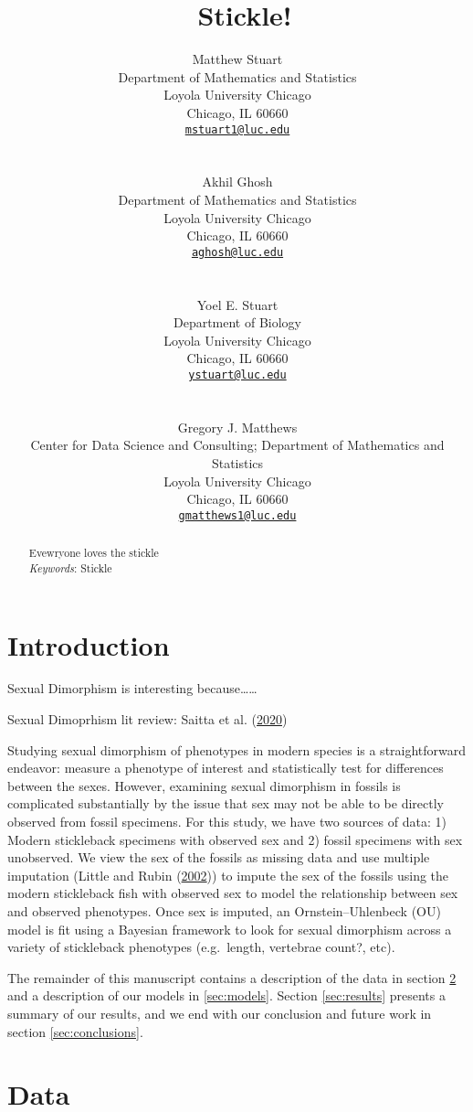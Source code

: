 \documentclass[
  12pt,
]{article}
\title{~\Large Stickle!}
\author{\large Matthew Stuart \vspace{-1.1mm}\\
\normalsize Department of Mathematics and Statistics \vspace{-1.1mm}\\
\normalsize Loyola University Chicago \vspace{-1.1mm}\\
\normalsize Chicago, IL 60660 \vspace{-1.1mm}\\
\normalsize \href{mailto:mstuart1@luc.edu}{\texttt{mstuart1@luc.edu}}
\vspace{-1.1mm}\\
\strut \\
\large Akhil Ghosh \vspace{-1.1mm}\\
\normalsize Department of Mathematics and Statistics \vspace{-1.1mm}\\
\normalsize Loyola University Chicago \vspace{-1.1mm}\\
\normalsize Chicago, IL 60660 \vspace{-1.1mm}\\
\normalsize \href{mailto:aghosh@luc.edu}{\texttt{aghosh@luc.edu}}
\vspace{-1.1mm}\\
\strut \\
\large Yoel E. Stuart \vspace{-1.1mm}\\
\normalsize Department of Biology \vspace{-1.1mm}\\
\normalsize Loyola University Chicago \vspace{-1.1mm}\\
\normalsize Chicago, IL 60660 \vspace{-1.1mm}\\
\normalsize \href{mailto:ystuart@luc.edu}{\texttt{ystuart@luc.edu}}
\vspace{-1.1mm}\\
\strut \\
\large Gregory J. Matthews \vspace{-1.1mm}\\
\normalsize Center for Data Science and Consulting; Department of
Mathematics and Statistics \vspace{-1.1mm}\\
\normalsize Loyola University Chicago \vspace{-1.1mm}\\
\normalsize Chicago, IL 60660 \vspace{-1.1mm}\\
\normalsize \href{mailto:gmatthews1@luc.edu}{\texttt{gmatthews1@luc.edu}}
\vspace{-1.1mm}}
\date{}
\begin{document}
\maketitle
\begin{abstract}
Evewryone loves the stickle \vspace{2mm}\\
\emph{Keywords}: Stickle
\end{abstract}

\newcommand{\iid}{\overset{iid}{\sim}}

\newpage

\hypertarget{sec:intro}{%
\section{Introduction}\label{sec:intro}}

Sexual Dimorphism is interesting because\ldots\ldots{}

Sexual Dimoprhism lit review: Saitta et al.
(\protect\hyperlink{ref-SaittaEtAl2020}{2020})

Studying sexual dimorphism of phenotypes in modern species is a
straightforward endeavor: measure a phenotype of interest and
statistically test for differences between the sexes. However, examining
sexual dimorphism in fossils is complicated substantially by the issue
that sex may not be able to be directly observed from fossil specimens.
For this study, we have two sources of data: 1) Modern stickleback
specimens with observed sex and 2) fossil specimens with sex unobserved.
We view the sex of the fossils as missing data and use multiple
imputation (Little and Rubin
(\protect\hyperlink{ref-little2002statistical}{2002})) to impute the sex
of the fossils using the modern stickleback fish with observed sex to
model the relationship between sex and observed phenotypes. Once sex is
imputed, an Ornstein--Uhlenbeck (OU) model is fit using a Bayesian
framework to look for sexual dimorphism across a variety of stickleback
phenotypes (e.g.~length, vertebrae count?, etc).

The remainder of this manuscript contains a description of the data in
section \ref{sec:data} and a description of our models in
\ref{sec:models}. Section \ref{sec:results} presents a summary of our
results, and we end with our conclusion and future work in section
\ref{sec:conclusions}.

\hypertarget{sec:data}{%
\section{Data}\label{sec:data}}
\end{document}
